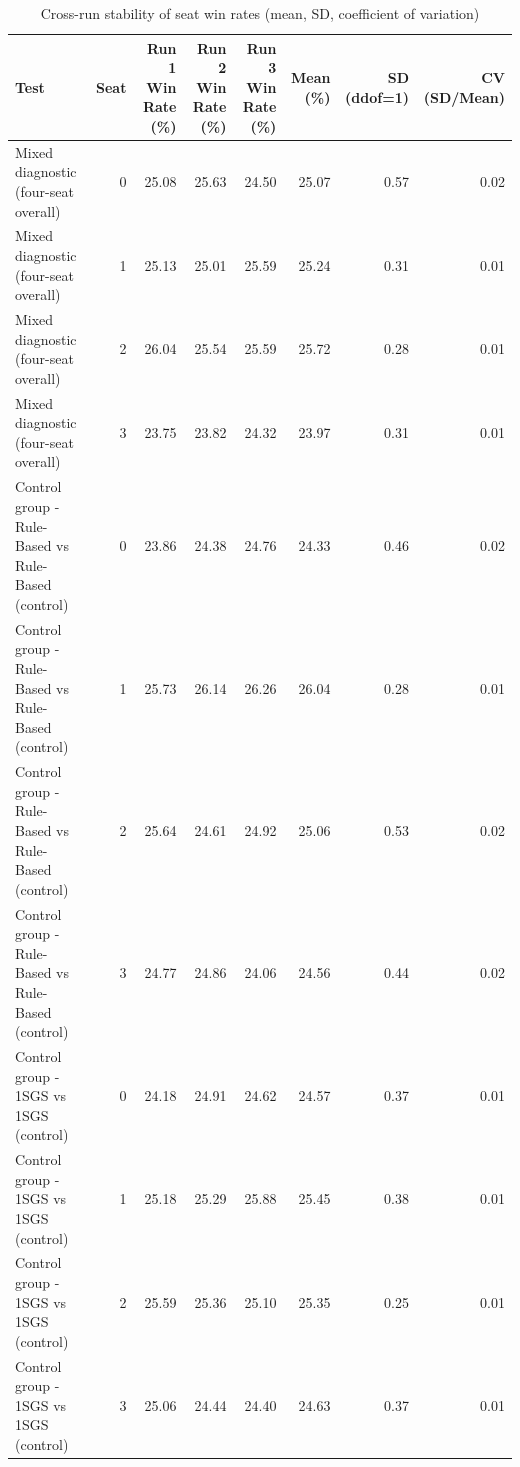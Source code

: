 \begin{table}[htbp]
\centering
\caption{Cross-run stability of seat win rates (mean, SD, coefficient of variation)}
\label{tab:seat_confirm_cv}
\begin{tabular}{lrrrrrrr}
\toprule
Test & Seat & Run 1 Win Rate (\%) & Run 2 Win Rate (\%) & Run 3 Win Rate (\%) & Mean (\%) & SD (ddof=1) & CV (SD/Mean) \\
\midrule
Mixed diagnostic (four-seat overall) & 0 & 25.08 & 25.63 & 24.50 & 25.07 & 0.57 & 0.02 \\
Mixed diagnostic (four-seat overall) & 1 & 25.13 & 25.01 & 25.59 & 25.24 & 0.31 & 0.01 \\
Mixed diagnostic (four-seat overall) & 2 & 26.04 & 25.54 & 25.59 & 25.72 & 0.28 & 0.01 \\
Mixed diagnostic (four-seat overall) & 3 & 23.75 & 23.82 & 24.32 & 23.97 & 0.31 & 0.01 \\
Control group - Rule-Based vs Rule-Based (control) & 0 & 23.86 & 24.38 & 24.76 & 24.33 & 0.46 & 0.02 \\
Control group - Rule-Based vs Rule-Based (control) & 1 & 25.73 & 26.14 & 26.26 & 26.04 & 0.28 & 0.01 \\
Control group - Rule-Based vs Rule-Based (control) & 2 & 25.64 & 24.61 & 24.92 & 25.06 & 0.53 & 0.02 \\
Control group - Rule-Based vs Rule-Based (control) & 3 & 24.77 & 24.86 & 24.06 & 24.56 & 0.44 & 0.02 \\
Control group - 1SGS vs 1SGS (control) & 0 & 24.18 & 24.91 & 24.62 & 24.57 & 0.37 & 0.01 \\
Control group - 1SGS vs 1SGS (control) & 1 & 25.18 & 25.29 & 25.88 & 25.45 & 0.38 & 0.01 \\
Control group - 1SGS vs 1SGS (control) & 2 & 25.59 & 25.36 & 25.10 & 25.35 & 0.25 & 0.01 \\
Control group - 1SGS vs 1SGS (control) & 3 & 25.06 & 24.44 & 24.40 & 24.63 & 0.37 & 0.01 \\
\bottomrule
\end{tabular}
\end{table}